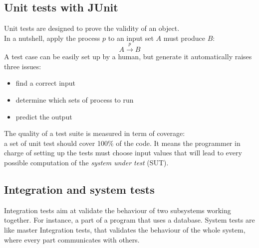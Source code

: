 \documentclass[a4paper]{report}
\begin{document}
\subsection*{Unit tests with JUnit}
Unit tests are designed to prove the validity of an object.\\
In a nutshell, apply the process $p$ to an input set $A$ must produce $B$:\\
\[A \xrightarrow{p} B\]
A test case can be easily set up by a human, but generate it automatically raises three issues:
\begin{itemize}
\item find a correct input
\item determine which sets of process to run
\item predict the output
\end{itemize}
The quality of a test suite is measured in term of coverage:\\
a set of unit test should cover 100\% of the code. It means the programmer in charge of setting up the tests must choose input values that will lead to every possible computation of the \textit{system under test} (SUT).\\

\subsection*{Integration and system tests}
Integration tests aim at validate the behaviour of two subsystems working together. For instance, a part of a program that uses a database. System tests are like master Integration tests, that validates the behaviour of the whole system, where every part communicates with others.\\

\end{document}
